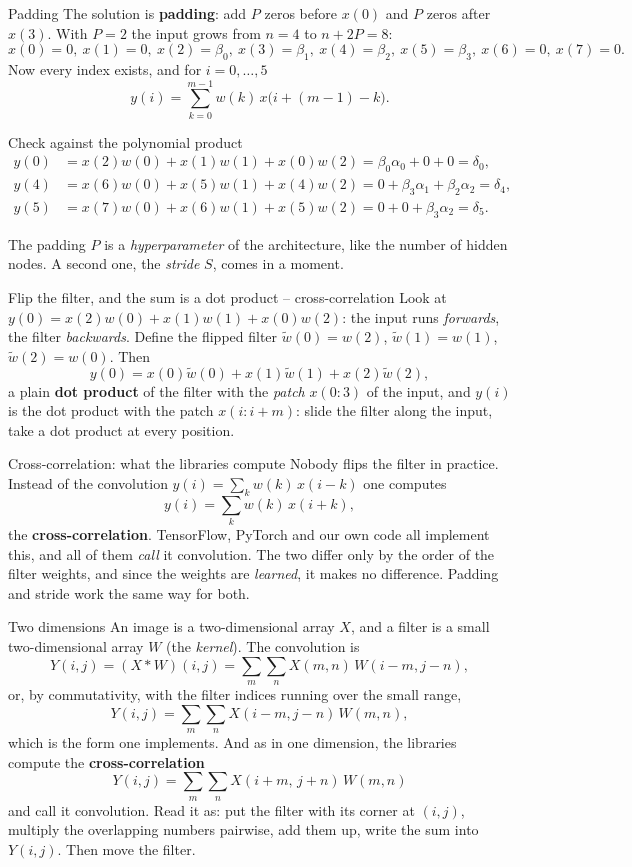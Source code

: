 \documentclass[10pt,aspectratio=169]{beamer}
\begin{document}
\begin{frame}{Padding}
\small
The solution is \textbf{padding}: add $P$ zeros before $x(0)$ and $P$ zeros
after $x(3)$.  With $P=2$ the input grows from $n=4$ to $n+2P=8$:
\[
  x(0)=0,\ x(1)=0,\ x(2)=\beta_0,\ x(3)=\beta_1,\ x(4)=\beta_2,\ x(5)=\beta_3,\
  x(6)=0,\ x(7)=0 .
\]
Now every index exists, and for $i=0,\dots,5$
\[
  y(i)=\sum_{k=0}^{m-1}w(k)\,x\bigl(i+(m-1)-k\bigr).
\]
\begin{block}{Check against the polynomial product}
\begin{align*}
  y(0)&=x(2)w(0)+x(1)w(1)+x(0)w(2)=\beta_0\alpha_0+0+0=\delta_0,\\
  y(4)&=x(6)w(0)+x(5)w(1)+x(4)w(2)=0+\beta_3\alpha_1+\beta_2\alpha_2=\delta_4,\\
  y(5)&=x(7)w(0)+x(6)w(1)+x(5)w(2)=0+0+\beta_3\alpha_2=\delta_5 .
\end{align*}
\end{block}
The padding $P$ is a \emph{hyperparameter} of the architecture, like the
number of hidden nodes.  A second one, the \emph{stride} $S$, comes in a
moment.
\end{frame}

\begin{frame}{Flip the filter, and the sum is a dot product -- cross-correlation}
\small
Look at $y(0)=x(2)w(0)+x(1)w(1)+x(0)w(2)$: the input runs \emph{forwards},
the filter \emph{backwards}.  Define the flipped filter
$\tilde w(0)=w(2)$, $\tilde w(1)=w(1)$, $\tilde w(2)=w(0)$.  Then
\[
  y(0)=x(0)\tilde w(0)+x(1)\tilde w(1)+x(2)\tilde w(2),
\]
a plain \textbf{dot product} of the filter with the \emph{patch}
$x(0{:}3)$ of the input, and $y(i)$ is the dot product with the patch
$x(i{:}i+m)$: slide the filter along the input, take a dot product at
every position.
\begin{block}{Cross-correlation: what the libraries compute}
Nobody flips the filter in practice.  Instead of the convolution
$y(i)=\sum_kw(k)\,x(i-k)$ one computes
\[
  y(i)=\sum_{k}w(k)\,x(i+k),
\]
the \textbf{cross-correlation}.  TensorFlow, PyTorch and our own code all
implement this, and all of them \emph{call} it convolution.  The two differ
only by the order of the filter weights, and since the weights are
\emph{learned}, it makes no difference.  Padding and stride work the same
way for both.
\end{block}
\end{frame}

\begin{frame}{Two dimensions}
\small
An image is a two-dimensional array $X$, and a filter is a small
two-dimensional array $W$ (the \emph{kernel}).  The convolution is
\[
  Y(i,j)=(X*W)(i,j)=\sum_m\sum_nX(m,n)\,W(i-m,j-n),
\]
or, by commutativity, with the filter indices running over the small
range,
\[
  Y(i,j)=\sum_m\sum_nX(i-m,j-n)\,W(m,n),
\]
which is the form one implements.  And as in one dimension, the libraries
compute the \textbf{cross-correlation}
\[
  \boxed{\;Y(i,j)=\sum_m\sum_nX(i+m,\,j+n)\,W(m,n)\;}
\]
and call it convolution.  Read it as: put the filter with its corner at
$(i,j)$, multiply the overlapping numbers pairwise, add them up, write
the sum into $Y(i,j)$.  Then move the filter.
\end{frame}
\end{document}
